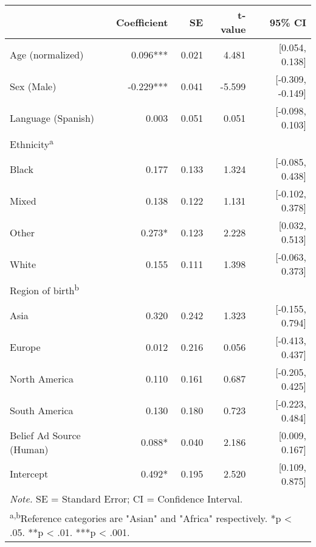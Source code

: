 \begin{table}[t]
\centering
\caption{}
\label{tab:demograph_donation_amount}
\begin{tabular}{lrrrr}
\toprule
\textbf{} & \textbf{Coefficient} & \textbf{SE} & \textbf{t-value} & \textbf{95\% CI} \\
\midrule
Age (normalized) & 0.096*** & 0.021 & 4.481 & [0.054, 0.138] \\
Sex (Male) & -0.229*** & 0.041 & -5.599 & [-0.309, -0.149] \\
Language (Spanish) & 0.003 & 0.051 & 0.051 & [-0.098, 0.103] \\
\addlinespace[3pt]
Ethnicity\textsuperscript{a} &&&&\\
\quad Black & 0.177 & 0.133 & 1.324 & [-0.085, 0.438] \\
\quad Mixed & 0.138 & 0.122 & 1.131 & [-0.102, 0.378] \\
\quad Other & 0.273* & 0.123 & 2.228 & [0.032, 0.513] \\
\quad White & 0.155 & 0.111 & 1.398 & [-0.063, 0.373] \\
\addlinespace[3pt]
Region of birth\textsuperscript{b} &&&&\\
\quad Asia & 0.320 & 0.242 & 1.323 & [-0.155, 0.794] \\
\quad Europe & 0.012 & 0.216 & 0.056 & [-0.413, 0.437] \\
\quad North America & 0.110 & 0.161 & 0.687 & [-0.205, 0.425] \\
\quad South America & 0.130 & 0.180 & 0.723 & [-0.223, 0.484] \\
\addlinespace[3pt]
Belief Ad Source (Human) & 0.088* & 0.040 & 2.186 & [0.009, 0.167] \\
Intercept & 0.492* & 0.195 & 2.520 & [0.109, 0.875] \\
\bottomrule
\multicolumn{5}{l}{\textit{Note.} SE = Standard Error; CI = Confidence Interval.} \\
\multicolumn{5}{l}{\textsuperscript{a,b}Reference categories are "Asian" and "Africa" respectively. *p < .05. **p < .01. ***p < .001.} \\
\end{tabular}
\vspace{1em}


\end{table}
